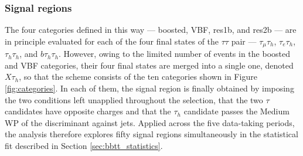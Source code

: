 \subsubsection{Signal regions}
%
The four categories defined in this way — boosted, VBF, res1b, and res2b — are in principle evaluated for each of the four final states of the $\tau\tau$ pair — $\tau_\mu\tau_h$, $\tau_e\tau_h$, $\tau_h\tau_h$, and $b\tau_h\tau_h$. However, owing to the limited number of events in the boosted and VBF categories, their four final states are merged into a single one, denoted $X\tau_h$, so that the scheme consists of the ten categories shown in Figure \ref{fig:categories}. In each of them, the signal region is finally obtained by imposing the two conditions left unapplied throughout the selection, that the two $\tau$ candidates have opposite charges and that the $\tau_h$ candidate passes the Medium WP of the discriminant against jets. Applied across the five data-taking periods, the analysis therefore explores fifty signal regions simultaneously in the statistical fit described in Section \ref{sec:bbtt_statistics}.
%
